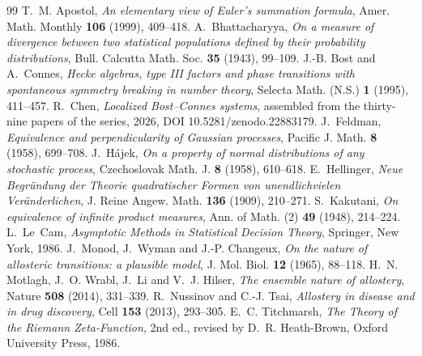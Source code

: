 \documentclass[11pt,reqno]{amsart}
\theoremstyle{plain}
\theoremstyle{definition}
\theoremstyle{remark}
\numberwithin{equation}{section}
\begin{document}
\begin{thebibliography}{99}
 T.~M. Apostol, \emph{An elementary view of Euler's summation formula}, Amer. Math. Monthly \textbf{106} (1999), 409--418.
 A.~Bhattacharyya, \emph{On a measure of divergence between two statistical populations defined by their probability distributions}, Bull. Calcutta Math. Soc. \textbf{35} (1943), 99--109.
 J.-B. Bost and A.~Connes, \emph{Hecke algebras, type III factors and phase transitions with spontaneous symmetry breaking in number theory}, Selecta Math. (N.S.) \textbf{1} (1995), 411--457.
 R.~Chen, \emph{Localized Bost--Connes systems}, assembled from the thirty-nine papers of the series, 2026, DOI 10.5281/zenodo.22883179.
 J.~Feldman, \emph{Equivalence and perpendicularity of Gaussian processes}, Pacific J. Math. \textbf{8} (1958), 699--708.
 J.~H\'ajek, \emph{On a property of normal distributions of any stochastic process}, Czechoslovak Math. J. \textbf{8} (1958), 610--618.
 E.~Hellinger, \emph{Neue Begr\"undung der Theorie quadratischer Formen von unendlichvielen Ver\"anderlichen}, J. Reine Angew. Math. \textbf{136} (1909), 210--271.
 S.~Kakutani, \emph{On equivalence of infinite product measures}, Ann. of Math. (2) \textbf{49} (1948), 214--224.
 L.~Le~Cam, \emph{Asymptotic Methods in Statistical Decision Theory}, Springer, New York, 1986.
 J.~Monod, J.~Wyman and J.-P. Changeux, \emph{On the nature of allosteric transitions: a plausible model}, J. Mol. Biol. \textbf{12} (1965), 88--118.
 H.~N. Motlagh, J.~O. Wrabl, J.~Li and V.~J. Hilser, \emph{The ensemble nature of allostery}, Nature \textbf{508} (2014), 331--339.
 R.~Nussinov and C.-J. Tsai, \emph{Allostery in disease and in drug discovery}, Cell \textbf{153} (2013), 293--305.
 E.~C. Titchmarsh, \emph{The Theory of the Riemann Zeta-Function}, 2nd ed., revised by D.~R. Heath-Brown, Oxford University Press, 1986.
\end{thebibliography}
\end{document}

